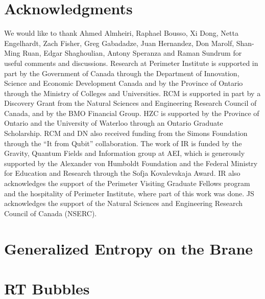 \documentclass[12pt]{article}
\renewcommand{\(}{\left(}
\renewcommand{\)}{\right)}
\renewcommand{\[}{\left[}
\renewcommand{\]}{\right]}
\begin{document}
\section*{Acknowledgments}
We would like to thank Ahmed Almheiri, Raphael Bousso, Xi Dong, Netta Engelhardt,  Zach Fisher, Greg Gabadadze, Juan Hernandez, Don Marolf, Shan-Ming Ruan, Edgar Shaghoulian, Antony Speranza and Raman Sundrum for useful comments and discussions. Research at Perimeter Institute is supported in part by the Government of Canada through the Department of Innovation, Science and Economic Development Canada and by the Province of Ontario through the Ministry of Colleges and Universities. RCM is supported in part by a Discovery Grant from the Natural Sciences and Engineering Research Council of Canada, and by the BMO Financial Group. HZC is supported by the Province of Ontario and the University of Waterloo through an Ontario Graduate Scholarship. RCM and DN also received funding from the Simons Foundation through the ``It from Qubit'' collaboration. The work of IR is funded by the Gravity, Quantum Fields and Information group at AEI, which is generously supported by the Alexander von Humboldt Foundation and the Federal Ministry for Education and Research  through the Sofja Kovalevskaja Award. IR also acknowledges the support of the Perimeter Visiting Graduate Fellows program and the hospitality of Perimeter Institute, where part of this work was done. JS acknowledges the support of the Natural Sciences and Engineering Research Council of Canada (NSERC).

\appendix

\section{Generalized Entropy on the Brane}\label{generalE}


\section{RT Bubbles}
\label{bubble}


%


%




\end{document}
